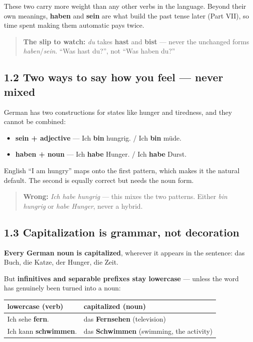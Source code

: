 \documentclass[
  11pt,
]{article}
\newcounter{none} %
\providecommand{\tightlist}{%
  \setlength{\itemsep}{0pt}\setlength{\parskip}{0pt}}
\begin{document}
These two carry more weight than any other verbs in the language. Beyond
their own meanings, \textbf{haben} and \textbf{sein} are what build the
past tense later (Part VII), so time spent making them automatic pays
twice.

\begin{quote}
\textbf{The slip to watch:} \emph{du} takes \textbf{hast} and
\textbf{bist} --- never the unchanged forms \emph{haben}/\emph{sein}.
``Was hast du?'', not ``Was haben du?''
\end{quote}

\subsection{1.2 Two ways to say how you feel --- never
mixed}\label{two-ways-to-say-how-you-feel-never-mixed}

German has two constructions for states like hunger and tiredness, and
they cannot be combined:

\begin{itemize}
\tightlist
\item
  \textbf{sein + adjective} --- Ich \textbf{bin} hungrig. / Ich
  \textbf{bin} müde.
\item
  \textbf{haben + noun} --- Ich \textbf{habe} Hunger. / Ich
  \textbf{habe} Durst.
\end{itemize}

English ``I am hungry'' maps onto the first pattern, which makes it the
natural default. The second is equally correct but needs the noun form.

\begin{quote}
\textbf{Wrong:} \emph{Ich habe hungrig} --- this mixes the two patterns.
Either \emph{bin hungrig} or \emph{habe Hunger}, never a hybrid.
\end{quote}

\subsection{1.3 Capitalization is grammar, not
decoration}\label{capitalization-is-grammar-not-decoration}

\textbf{Every German noun is capitalized}, wherever it appears in the
sentence: das Buch, die Katze, der Hunger, die Zeit.

But \textbf{infinitives and separable prefixes stay lowercase} ---
unless the word has genuinely been turned into a noun:

{\def\LTcaptype{none} %
\begin{longtable}[]{@{}ll@{}}
\toprule\noalign{}
lowercase (verb) & capitalized (noun) \\
\midrule\noalign{}
\endhead
\bottomrule\noalign{}
\endlastfoot
Ich sehe \textbf{fern}. & das \textbf{Fernsehen} (television) \\
Ich kann \textbf{schwimmen}. & das \textbf{Schwimmen} (swimming, the
activity) \\
\end{longtable}
}
\end{document}

